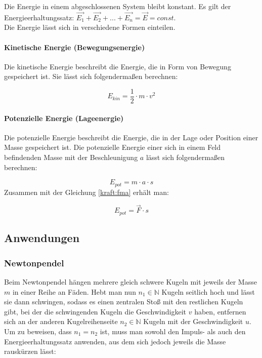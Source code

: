 \documentclass[a4paper]{article}
\begin{document}
				Die Energie in einem abgeschlossenen System bleibt konstant. Es gilt der Energieerhaltungssatz: $\vec{E_1} + \vec{E_2} + ... + \vec{E_n} = \vec{E} = const$.\\
				Die Energie lässt sich in verschiedene Formen einteilen.
				
				\paragraph{Kinetische Energie (Bewegungsenergie)}\label{energie_kin}
					Die kinetische Energie beschreibt die Energie, die in Form von Bewegung gespeichert ist. Sie lässt sich folgendermaßen berechnen:
					
					\begin{equation}\label{energie_kin_eq}
						E_{kin} = \frac{1}{2}\cdot m\cdot v^2
					\end{equation}
					
				\paragraph{Potenzielle Energie (Lageenergie)}\label{energie_pot}
					Die potenzielle Energie beschreibt die Energie, die in der Lage oder Position einer Masse gespeichert ist. Die potenzielle Energie einer sich in einem Feld befindenden Masse mit der Beschleunigung $a$ lässt sich folgendermaßen berechnen:
					
					\begin{equation}
						E_{pot} = m\cdot a \cdot s
					\end{equation}
					Zusammen mit der Gleichung \ref{kraft:fma} erhält man:
					
					\begin{equation}\label{energie:fs}
						E_{pot} = \vec{F} \cdot s
					\end{equation}
	
		\subsection{Anwendungen}
			\subsubsection{Newtonpendel}
				Beim Newtonpendel hängen mehrere gleich schwere Kugeln mit jeweils der Masse $m$ in einer Reihe an Fäden. Hebt man nun $n_1 \in \mathbb{N}$ Kugeln seitlich hoch und lässt sie dann schwingen, sodass es einen zentralen Stoß mit den restlichen Kugeln gibt, bei der die schwingenden Kugeln die Geschwindigkeit $v$ haben, entfernen sich an der anderen Kugelreihenseite $n_2 \in \mathbb{N}$ Kugeln mit der Geschwindigkeit $u$. Um zu beweisen, dass $n_1 = n_2$ ist, muss man sowohl den Impuls- als auch den Energieerhaltungssatz anwenden, aus dem sich jedoch jeweils die Masse rauskürzen lässt:
				
\end{document}

